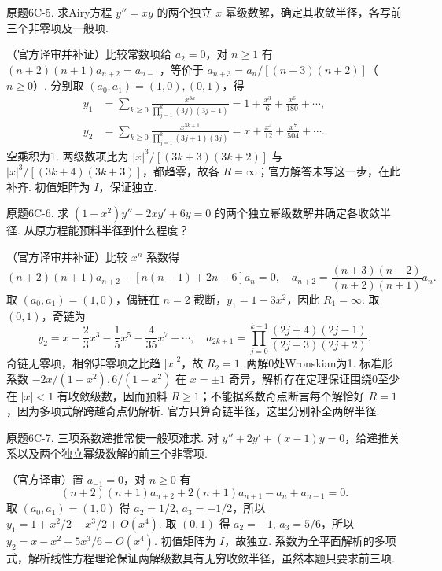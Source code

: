 \begin{exercise}\label{cw:bank-6C-5}原题6C-5. 求Airy方程 $y''=xy$ 的两个独立 $x$ 幂级数解，确定其收敛半径，各写前三个非零项及一般项.\end{exercise}
\begin{solution}（官方译审并补证）比较常数项给 $a_2=0$，对 $n\ge1$ 有 $(n+2)(n+1)a_{n+2}=a_{n-1}$，等价于 $a_{n+3}=a_n/[(n+3)(n+2)]$（$n\ge0$）. 分别取 $(a_0,a_1)=(1,0),(0,1)$，得
\[\begin{aligned}
y_1&=\sum_{k\ge0}\frac{x^{3k}}{\prod_{j=1}^k(3j)(3j-1)}=1+\frac{x^3}{6}+\frac{x^6}{180}+\cdots,\\
y_2&=\sum_{k\ge0}\frac{x^{3k+1}}{\prod_{j=1}^k(3j+1)(3j)}=x+\frac{x^4}{12}+\frac{x^7}{504}+\cdots.
\end{aligned}\]
空乘积为1. 两级数项比为 $|x|^3/[(3k+3)(3k+2)]$ 与 $|x|^3/[(3k+4)(3k+3)]$，都趋零，故各 $R=\infty$；官方解答未写这一步，在此补齐. 初值矩阵为 $I$，保证独立.\end{solution}
\begin{exercise}\label{cw:bank-6C-6}原题6C-6. 求 $(1-x^2)y''-2xy'+6y=0$ 的两个独立幂级数解并确定各收敛半径. 从原方程能预料半径到什么程度？\end{exercise}
\begin{solution}（官方译审并补证）比较 $x^n$ 系数得
\[(n+2)(n+1)a_{n+2}-[n(n-1)+2n-6]a_n=0,
\quad a_{n+2}=\frac{(n+3)(n-2)}{(n+2)(n+1)}a_n.
\]
取 $(a_0,a_1)=(1,0)$，偶链在 $n=2$ 截断，$y_1=1-3x^2$，因此 $R_1=\infty$. 取 $(0,1)$，奇链为
\[y_2=x-\frac23x^3-\frac15x^5-\frac4{35}x^7-\cdots,
\quad a_{2k+1}=\prod_{j=0}^{k-1}\frac{(2j+4)(2j-1)}{(2j+3)(2j+2)}.
\]
奇链无零项，相邻非零项之比趋 $|x|^2$，故 $R_2=1$. 两解0处Wronskian为1. 标准形系数 $-2x/(1-x^2),6/(1-x^2)$ 在 $x=\pm1$ 奇异，解析存在定理保证围绕0至少在 $|x|<1$ 有收敛级数，因而预料 $R\ge1$；不能据系数奇点断言每个解恰好 $R=1$，因为多项式解跨越奇点仍解析. 官方只算奇链半径，这里分别补全两解半径.\end{solution}
\begin{exercise}\label{cw:bank-6C-7}原题6C-7. 三项系数递推常使一般项难求. 对 $y''+2y'+(x-1)y=0$，给递推关系以及两个独立幂级数解的前三个非零项.\end{exercise}
\begin{solution}（官方译审）置 $a_{-1}=0$，对 $n\ge0$ 有
\[(n+2)(n+1)a_{n+2}+2(n+1)a_{n+1}-a_n+a_{n-1}=0.
\]
取 $(a_0,a_1)=(1,0)$ 得 $a_2=1/2$, $a_3=-1/2$，所以 $y_1=1+x^2/2-x^3/2+O(x^4)$. 取 $(0,1)$ 得 $a_2=-1$, $a_3=5/6$，所以 $y_2=x-x^2+5x^3/6+O(x^4)$. 初值矩阵为 $I$，故独立. 系数为全平面解析的多项式，解析线性方程理论保证两解级数具有无穷收敛半径，虽然本题只要求前三项.\end{solution}
